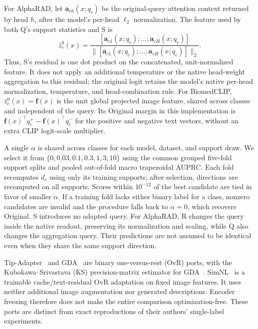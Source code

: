 For AlphaRAD, let $\mathbf a_{ch}(x;q_c)$ be the original-query attention context returned by head $h$, after the model's per-head $\ell_2$ normalization. The feature used by both Q's support statistics and S is
\begin{equation}
\bar z_c^0(x)=
\frac{[\mathbf a_{c1}(x;q_c);\ldots;\mathbf a_{cH}(x;q_c)]}
{\|[\mathbf a_{c1}(x;q_c);\ldots;\mathbf a_{cH}(x;q_c)]\|_2}.
\end{equation}
Thus, S's residual is one dot product on the concatenated, unit-normalized feature. It does not apply an additional temperature or the native head-weight aggregation to this residual; the original logit retains the model's native per-head normalization, temperature, and head-combination rule. For BiomedCLIP, $\bar z_c^0(x)=\mathbf f(x)$ is the unit global projected image feature, shared across classes and independent of the query. Its Original margin in this implementation is $\mathbf f(x)^\top q_c^+-\mathbf f(x)^\top q_c^-$ for the positive and negative text vectors, without an extra CLIP logit-scale multiplier.

A single $\alpha$ is shared across classes for each model, dataset, and support draw. We select it from $\{0,0.03,0.1,0.3,1,3,10\}$ using the common grouped five-fold support splits and pooled out-of-fold macro trapezoidal AUPRC. Each fold recomputes $d_c$ using only its training supports; after selection, directions are recomputed on all supports. Scores within $10^{-12}$ of the best candidate are tied in favor of smaller $\alpha$. If a training fold lacks either binary label for a class, nonzero candidates are invalid and the procedure falls back to $\alpha=0$, which recovers Original. S introduces no adapted query. For AlphaRAD, R changes the query inside the native readout, preserving its normalization and scaling, while Q also changes the aggregation query. Their predictions are not assumed to be identical even when they share the same support direction.

Tip-Adapter~\cite{tipadapter} and GDA~\cite{gda} are binary one-versus-rest (OvR) ports, with the Kubokawa--Srivastava (KS) precision-matrix estimator for GDA~\cite{kubokawa2008precision}. SimNL~\cite{simnl} is a trainable cache/text-residual OvR adaptation on fixed image features. It uses neither additional image augmentation nor generated descriptions. Encoder freezing therefore does not make the entire comparison optimization-free. These ports are distinct from exact reproductions of their authors' single-label experiments.


